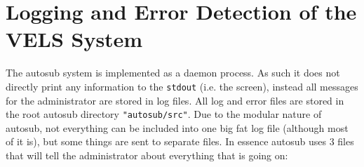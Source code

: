\section{Logging and Error Detection of the VELS System}\label{logerror}

The autosub system is implemented as a daemon process. As such it does not
directly print any information to the {\tt stdout} (i.e. the screen), instead
all messages for the administrator are stored in log files. All log and error files
are stored in the root autosub directory {\tt "autosub/src"}. Due to the modular
nature of autosub, not everything can be included into one big fat log file
(although most of it is), but some things are sent to separate files.
In essence autosub uses 3 files that will tell the administrator about everything
that is going on:

